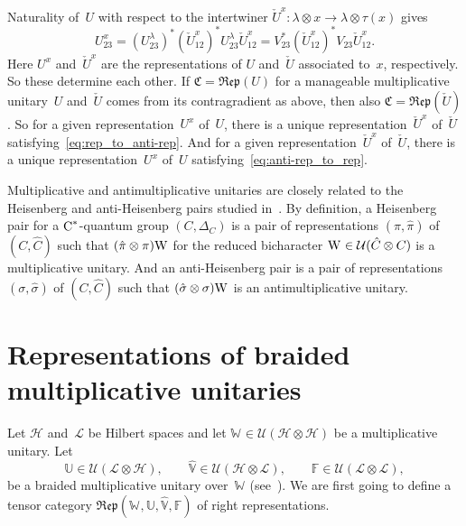 \documentclass[a4paper]{amsart}
\numberwithin{equation}{section}
\theoremstyle{plain}
\numberwithin{theorem}{section}
\theoremstyle{definition}
\theoremstyle{remark}
\newcommand*{\Corep}[1]{\mathbb{#1}}          %
\newcommand*{\DuCorep}[1]{\hat{\Corep{#1}}}   %
\newcommand*{\Cat}{\mathfrak C}     %
\newcommand*{\Corepcat}[1]{\mathfrak{Rep}(#1)}%
\newcommand*{\Trivial}{\tau}%
\newcommand*{\nb}{\nobreakdash}
\newcommand*{\Comult}[1][]{\Delta_{#1}}%
\newcommand*{\Multunit}[1][]{\mathbb W^{#1}}%
\newcommand*{\multunit}[1][]{\textup W^{#1}}%
\newcommand*{\BrMultunit}{\mathbb F}%
\newcommand*{\Cst}{\textup C^*}%
\newcommand*{\Hils}[1][H]{\mathcal{#1}}%
\newcommand*{\U}{\mathcal U}%
\begin{document}
Naturality of~\(U\)
with respect to the intertwiner
\(\check{U}^x\colon \lambda\otimes x \to \lambda\otimes\Trivial(x)\)
gives
\begin{equation}
  \label{eq:anti-rep_to_rep}
  U^x_{23}
  = (U^\lambda_{23})^* (\check{U}^x_{12})^* U^\lambda_{23} \check{U}^x_{12}
  = V_{23}^* (\check{U}^x_{12})^* V_{23}^{\phantom{*}} \check{U}^x_{12}.
\end{equation}
Here \(U^x\)
and~\(\check{U}^x\)
are the representations of \(U\)
and~\(\check{U}\)
associated to~\(x\),
respectively.  So these determine each other.  If
\(\Cat=\Corepcat{U}\)
for a manageable multiplicative unitary~\(U\)
and~\(\check{U}\)
comes from its contragradient as above, then also
\(\Cat=\Corepcat{\check{U}}\).
So for a given representation~\(U^x\)
of~\(U\),
there is a unique representation~\(\check{U}^x\)
of~\(\check{U}\)
satisfying~\eqref{eq:rep_to_anti-rep}.  And for a given
representation~\(\check{U}^x\)
of~\(\check{U}\),
there is a unique representation~\(U^x\)
of~\(U\) satisfying~\eqref{eq:anti-rep_to_rep}.

Multiplicative and antimultiplicative unitaries are closely related to
the Heisenberg and anti-Heisenberg pairs studied
in~\cite{Meyer-Roy-Woronowicz:Twisted_tensor}.  By definition, a
Heisenberg pair for a \(\Cst\)\nb-quantum
group \((C,\Comult[C])\)
is a pair of representations \((\pi,\hat\pi)\)
of \((C,\hat{C})\)
such that \((\hat{\pi}\otimes\pi)\multunit\)
for the reduced bicharacter \(\multunit\in\U(\hat{C}\otimes C)\)
is a multiplicative unitary.  And an anti-Heisenberg pair is a pair of
representations \((\sigma,\hat\sigma)\)
of \((C,\hat{C})\)
such that \((\hat{\sigma}\otimes\sigma)\multunit\)
is an antimultiplicative unitary.


\section{Representations of braided multiplicative unitaries}
\label{sec:corep_braided}

Let \(\Hils\)
and~\(\Hils[L]\)
be Hilbert spaces and let \(\Multunit \in \U(\Hils\otimes\Hils)\)
be a multiplicative unitary.  Let
\[
\Corep{U}\in\U(\Hils[L]\otimes\Hils),\qquad
\DuCorep{V}\in\U(\Hils\otimes\Hils[L]),\qquad
\BrMultunit\in\U(\Hils[L]\otimes\Hils[L]),
\]
be a braided multiplicative unitary over~\(\Multunit\)
(see~\cite{Meyer-Roy-Woronowicz:Qgrp_proj}).  We are first going to
define a tensor category
\(\Corepcat{\Multunit,\Corep{U},\DuCorep{V},\BrMultunit}\)
of right representations.
\end{document}
